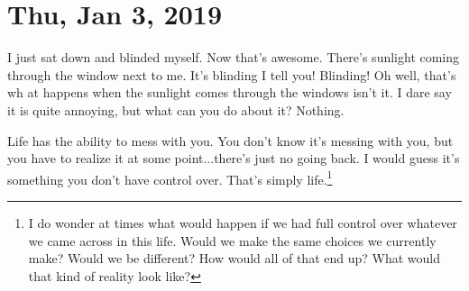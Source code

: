 \section{Thu, Jan 3, 2019}

I just sat down and blinded myself. Now that's awesome. There's sunlight coming
through the window next to me. It's blinding I tell you! Blinding! Oh well, that's wh
at happens when the sunlight comes through the windows isn't it. I dare say it is
quite annoying, but what can you do about it? Nothing.

Life has the ability to mess with you. You don't know it's messing with you, but you
have to realize it at some point...there's just no going back. I would guess it's
something you don't have control over. That's simply life.\footnote{I do wonder at 
times what would happen if we had full control over whatever we came across in this
life. Would we make the same choices we currently make? Would we be different? How
would all of that end up? What would that kind of reality look like?}